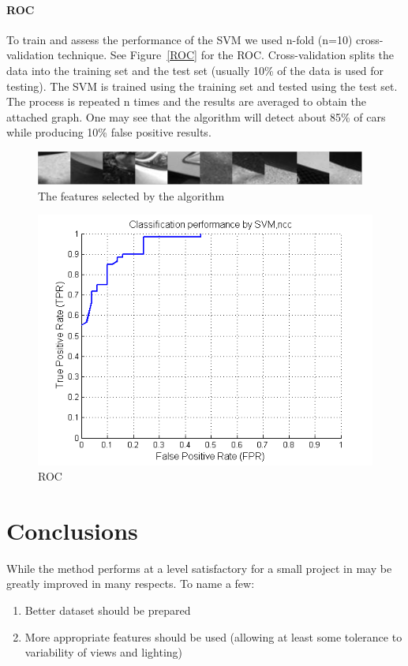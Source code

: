 \documentclass[12pt]{article}
\begin{document}
\paragraph{ROC} To train and assess the performance of the SVM we used n-fold (n=10) cross-validation technique. See Figure~\ref{ROC} for the ROC.  Cross-validation splits the data into the training set and the test set (usually 10\% of the data is used for testing).  The SVM is trained using the training set and tested using the test set.  The process is repeated n times and the results are averaged to obtain the attached graph.  One may see that the algorithm will detect about 85\% of cars while producing 10\% false positive results.

\begin{figure} \centering
	\includegraphics[width=.4\linewidth]{good_features.png}
	\caption{The features selected by the algorithm}
	\label{fig:sub3}
\end{figure}

\begin{figure} \centering
	\includegraphics{roc.png}
	\caption{ROC}
	\label{fig:sub4}
\end{figure}

\section{Conclusions}

While the method performs at a level satisfactory for a small project in may be greatly improved in many respects.  To name a few:
\begin{enumerate}
\item Better dataset should be prepared
\item More appropriate features should be used (allowing at least some tolerance to variability of views and lighting)
\end{enumerate}
\end{document}
